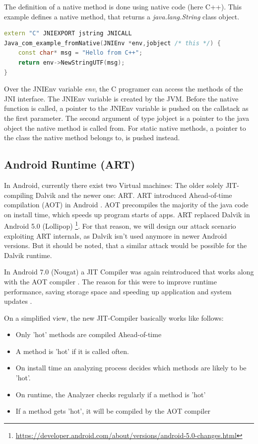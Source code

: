 The definition of  a native method is done using native code (here C++). This example defines a native method, that returns a \emph{java.lang.String} class object.
\begin{lstlisting}[language=C++, style=CppCodeStyle, caption=Native Hello World Example]
extern "C" JNIEXPORT jstring JNICALL
Java_com_example_fromNative(JNIEnv *env,jobject /* this */) {
    const char* msg = "Hello from C++";
    return env->NewStringUTF(msg);
}
\end{lstlisting}

Over the JNIEnv variable \emph{env}, the C programer can access the methods of the JNI interface. The JNIEnv variable is created by the JVM. Before the native function is called, a pointer to the JNIEnv variable is pushed on the callstack as the first parameter. The second argument of type jobject is a pointer to the java object the native method is called from. For static native methods, a pointer to the class the native method belongs to, is pushed instead. 

\subsection{Android Runtime (ART)}
In Android, currently there exist two Virtual machines: The older solely JIT-compiling Dalvik and the newer one: ART. ART introduced Ahead-of-time compilation (AOT) in Android \cite{ArtAndDalvik}. AOT precompiles the majority of the java code on install time, which speeds up program starts of apps. ART replaced Dalvik in Android 5.0 (Lollipop) \footnote{\url{https://developer.android.com/about/versions/android-5.0-changes.html}}. For that reason, we will design our attack scenario exploiting ART internals, as Dalvik isn't used anymore in newer Android versions. But it should be noted, that a similar attack would be possible for the Dalvik runtime.

In Android 7.0 (Nougat) a JIT Compiler was again reintroduced that works along with the AOT compiler \cite{Android7ForDevelopers}. The reason for this were to improve runtime performance, saving storage space and speeding up application and system updates \cite{JitWorkFlow}.

On a simplified view, the new JIT-Compiler basically works like follows:  


\begin{itemize}
    \item Only 'hot' methods are compiled Ahead-of-time 
    \item A method is 'hot' if it is called often.
    \item On install time an analyzing process decides which methods are likely to be 'hot'.
    \item On runtime, the Analyzer checks regularly if a method is 'hot'
    \item If a method gets 'hot', it will be compiled by the AOT compiler
    \end{itemize}
    
